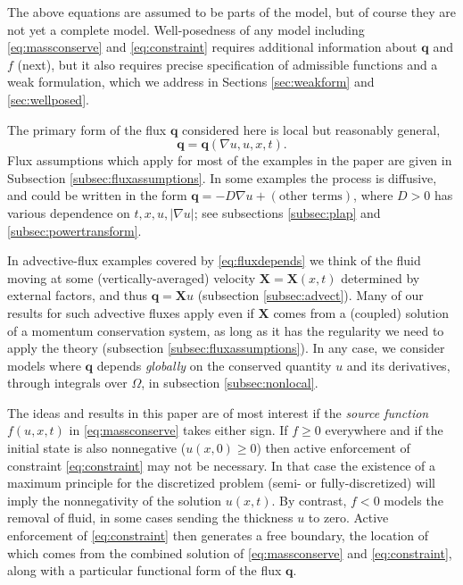 \documentclass[final,leqno,onefignum,onetabnum]{siamltex1213bueler}
\newcommand\bq{\mathbf{q}}
\newcommand\bX{\mathbf{X}}
\renewcommand{\grad}{\nabla}
\begin{document}
The above equations are assumed to be parts of the model, but of course they are not yet a complete model.  Well-posedness of any model including \eqref{eq:massconserve} and \eqref{eq:constraint} requires additional information about $\bq$ and $f$ (next), but it also requires precise specification of admissible functions and a weak formulation, which we address in Sections \ref{sec:weakform} and \ref{sec:wellposed}.

The primary form of the flux $\bq$ considered here is local but reasonably general,
\begin{equation}
\bq = \bq(\grad u,u,x,t). \label{eq:fluxdepends}
\end{equation}
Flux assumptions which apply for most of the examples in the paper are given in Subsection \ref{subsec:fluxassumptions}.  In some examples the process is diffusive, and could be written in the form $\bq=- D \grad u + (\text{other terms})$, where $D > 0$ has various dependence on $t,x,u,|\grad u|$; see subsections \ref{subsec:plap} and \ref{subsec:powertransform}.

In advective-flux examples covered by \eqref{eq:fluxdepends} we think of the fluid moving at some (vertically-averaged) velocity $\bX=\bX(x,t)$ determined by external factors, and thus $\bq = \bX u$ (subsection \ref{subsec:advect}).  Many of our results for such advective fluxes apply even if $\bX$ comes from a (coupled) solution of a momentum conservation system, as long as it has the regularity we need to apply the theory (subsection \ref{subsec:fluxassumptions}).  In any case, we consider models where $\bq$ depends \emph{globally} on the conserved quantity $u$ and its derivatives, through integrals over $\Omega$, in subsection \ref{subsec:nonlocal}.

The ideas and results in this paper are of most interest if the \emph{source function} $f(u,x,t)$ in \eqref{eq:massconserve} takes either sign.  If $f\ge 0$ everywhere and if the initial state is also nonnegative ($u(x,0)\ge 0$) then active enforcement of constraint \eqref{eq:constraint} may not be necessary.  In that case the existence of a maximum principle for the discretized problem (semi- or fully-discretized) will imply the nonnegativity of the solution $u(x,t)$.  By contrast, $f<0$ models the removal of fluid, in some cases sending the thickness $u$ to zero.  Active enforcement of \eqref{eq:constraint} then generates a free boundary, the location of which comes from the combined solution of \eqref{eq:massconserve} and \eqref{eq:constraint}, along with a particular functional form of the flux $\bq$.
\end{document}
